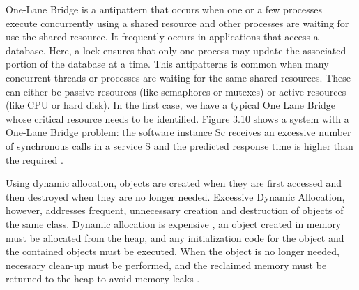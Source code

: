 \documentclass{report}
\begin{document}
One-Lane Bridge is a antipattern that occurs when one or a few processes execute concurrently using a shared resource and other processes are waiting for use the shared resource. It frequently occurs in applications that access a database. Here, a lock ensures that only one process may update the associated portion of the database at a time. This antipatterns is common when many concurrent threads or processes are waiting for the same shared resources. These can either be passive resources (like semaphores or mutexes) or active resources (like CPU or hard disk). In the first case, we have a typical One Lane Bridge whose critical resource needs to be identified. Figure 3.10 shows a system with a One-Lane Bridge problem:  the software instance Sc receives an excessive number of synchronous calls in a service S and the predicted response time is higher than the required \cite{Vetoio2011}.


Using dynamic allocation, objects are created when they are first accessed and then destroyed when they are no longer needed. Excessive Dynamic Allocation, however, addresses frequent, unnecessary creation and destruction of objects of the same class. Dynamic allocation is expensive , an object created in memory must be allocated from the heap, and any initialization code for the object and the contained objects must be executed. When the object is no longer needed, necessary clean-up must be performed, and the reclaimed memory must be returned to the heap to avoid memory leaks \cite{Smith2002} \cite{Smith2003}.
\end{document}
